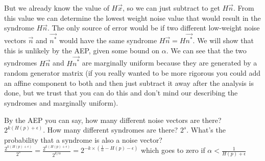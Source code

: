 \documentclass[11pt]{article}
\begin{document}
\begin{enumerate}
\begin{enumerate}
        But we already know the value of $H\vec{x}$, so we can just subtract to get $H\vec{n}$. From this value we can determine the lowest weight noise value that would result in the syndrome $H\vec{n}$. The only source of error would be if two different low-weight noise vectors $\vec{n}$ and $\vec{n^*}$ would have the same syndrome $H\vec{n} = H\vec{n^*}$. We will show that this is unlikely by the AEP, given some bound on $\alpha$. We can see that the two syndromes $H\vec{n}$ and $H\vec{n^*}$ are marginally uniform because they are generated by a random generator matrix (if you really wanted to be more rigorous you could add an affine component to both and then just subtract it away after the analysis is done, but we trust that you can do this and don't mind our describing the syndromes and marginally uniform).

        By the AEP you can say, how many different noise vectors are there? $2^{k(H(p) + \epsilon)}$. How many different syndromes are there? $2^s$. What's the probability that a syndrome is also a noise vector? $\frac{2^{k(H(p) + \epsilon)}}{2^s} = \frac{2^{k(H(p) + \epsilon)}}{2^{k/\alpha}} = 2^{-k\times(\frac{1}{\alpha} - H(p) - \epsilon)}$ which goes to zero if $\alpha < \frac{1}{H(p) + \epsilon}$



\end{enumerate}
\end{enumerate}
\end{document}
